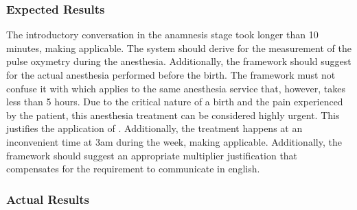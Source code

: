 \subsubsection{Expected Results}

The introductory conversation in the anamnesis stage took longer than 10 minutes, making  applicable.
The system should derive  for the measurement of the pulse oxymetry during the anesthesia.
Additionally, the framework should suggest
for the actual anesthesia performed before the birth.
The framework must not confuse it with  which applies to the same anesthesia service that, however, takes less than 5 hours.
Due to the critical nature of a birth and the pain experienced by the patient, this anesthesia treatment can be considered highly urgent.
This justifies the application of .
Additionally, the treatment happens at an inconvenient time at 3am during the week,
making  applicable.
Additionally, the framework should suggest an appropriate multiplier justification that compensates for the requirement to communicate in english.

\subsubsection{Actual Results}

%


